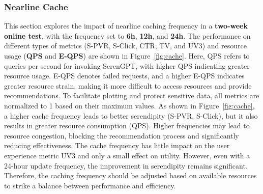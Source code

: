 \subsubsection{Nearline Cache} 
 This section explores the impact of nearline caching frequency in a \textbf{two-week online test}, with the frequency set to \textbf{6h}, \textbf{12h}, and \textbf{24h}. The performance on different types of metrics (S-PVR, S-Click, CTR, TV, and UV3) and resource usage (\textbf{QPS} and \textbf{E-QPS}) are shown in Figure~\ref{fig:cache}. Here, QPS refers to queries per second for invoking SerenGPT, with higher QPS indicating greater resource usage. E-QPS denotes failed requests, and a higher E-QPS indicates greater resource strain, making it more difficult to access resources and provide recommendations. To facilitate plotting and protect sensitive data, all metrics are normalized to 1 based on their maximum values. As shown in Figure~\ref{fig:cache}, a higher cache frequency leads to better serendipity (S-PVR, S-Click), but it also results in greater resource consumption (QPS). Higher frequencies may lead to resource congestion, blocking the recommendation process and significantly reducing effectiveness. The cache frequency has little impact on the user experience metric UV3 and only a small effect on utility. However, even with a 24-hour update frequency, the improvement in serendipity remains significant. Therefore, the caching frequency should be adjusted based on available resources to strike a balance between performance and efficiency.





